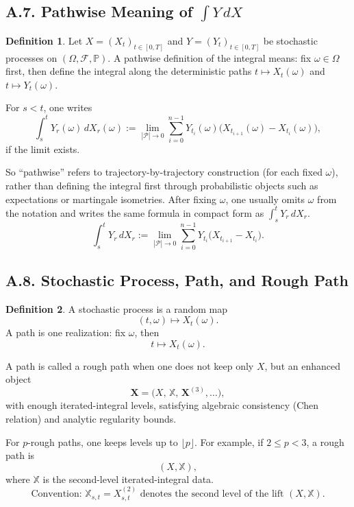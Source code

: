 \documentclass[11pt]{article}
\theoremstyle{definition}
\newtheorem{definition}{Definition}
\theoremstyle{remark}
\begin{document}
\subsection*{A.7. Pathwise Meaning of $\int Y\,dX$}
\begin{definition}
Let $X=(X_t)_{t\in[0,T]}$ and $Y=(Y_t)_{t\in[0,T]}$ be stochastic processes on $(\Omega,\mathcal F,\mathbb P)$. A pathwise definition of the integral means: fix $\omega\in\Omega$ first, then define the integral along the deterministic paths $t\mapsto X_t(\omega)$ and $t\mapsto Y_t(\omega)$.

For $s<t$, one writes
\[
\int_s^t Y_r(\omega)\,dX_r(\omega)
:=
\lim_{|\mathcal P|\to0}\sum_{i=0}^{n-1}
Y_{t_i}(\omega)\bigl(X_{t_{i+1}}(\omega)-X_{t_i}(\omega)\bigr),
\]
if the limit exists.

So ``pathwise'' refers to trajectory-by-trajectory construction (for each fixed $\omega$), rather than defining the integral first through probabilistic objects such as expectations or martingale isometries.
After fixing $\omega$, one usually omits $\omega$ from the notation and writes the same formula in compact form as $\int_s^t Y_r\,dX_r$.
\[
\int_s^t Y_r\,dX_r
:=
\lim_{|\mathcal P|\to0}\sum_{i=0}^{n-1}
Y_{t_i}\bigl(X_{t_{i+1}}-X_{t_i}\bigr).
\]
\end{definition}

\subsection*{A.8. Stochastic Process, Path, and Rough Path}
\begin{definition}
A stochastic process is a random map
\[
(t,\omega)\mapsto X_t(\omega).
\]
A path is one realization: fix $\omega$, then
\[
t\mapsto X_t(\omega).
\]

A path is called a rough path when one does not keep only $X$, but an enhanced object
\[
\mathbf X=\bigl(X,\,\mathbb X,\,\mathbf X^{(3)},\dots\bigr),
\]
with enough iterated-integral levels, satisfying algebraic consistency (Chen relation) and analytic regularity bounds.

For $p$-rough paths, one keeps levels up to $\lfloor p\rfloor$. For example, if $2\le p<3$, a rough path is
\[
(X,\mathbb X),
\]
where $\mathbb X$ is the second-level iterated-integral data.
\[
\text{Convention: }\mathbb X_{s,t}=X_{s,t}^{(2)}\text{ denotes the second level of the lift }(X,\mathbb X).
\]
\end{definition}
\end{document}
